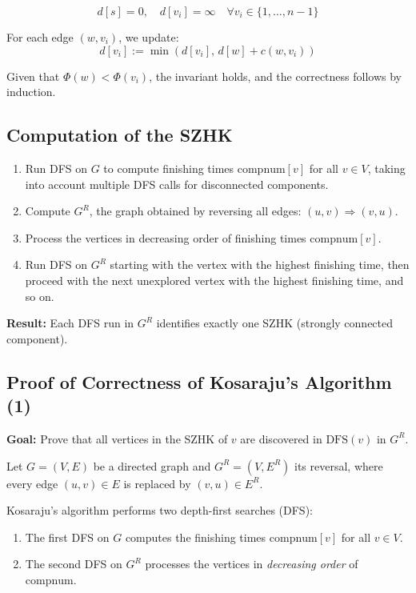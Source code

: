 \documentclass{article}
\begin{document}
\[
d[s] = 0, \quad d[v_i] = \infty \quad \forall v_i \in \{1, \ldots, n-1\}
\]

For each edge $(w, v_i)$, we update:
\[
d[v_i] := \min(d[v_i], \, d[w] + c(w, v_i))
\]

Given that $\Phi(w) < \Phi(v_i)$, the invariant holds, and the correctness follows by induction.

\subsection{Computation of the SZHK}

\begin{enumerate}
    \item Run DFS on $G$ to compute finishing times $\text{compnum}[v]$ for all $v \in V$, taking into account multiple DFS calls for disconnected components.
    \item Compute $G^R$, the graph obtained by reversing all edges: $(u,v) \Rightarrow (v,u)$.
    \item Process the vertices in decreasing order of finishing times $\text{compnum}[v]$.
    \item Run DFS on $G^R$ starting with the vertex with the highest finishing time, then proceed with the next unexplored vertex with the highest finishing time, and so on.
\end{enumerate}

\noindent
\textbf{Result:} Each DFS run in $G^R$ identifies exactly one SZHK (strongly connected component).

\subsection{Proof of Correctness of Kosaraju's Algorithm (1)}
\textbf{Goal:} Prove that all vertices in the SZHK of $v$ are discovered in $\text{DFS}(v)$ in $G^R$.

Let $G = (V, E)$ be a directed graph and $G^R = (V, E^R)$ its reversal, where every edge $(u, v) \in E$ is replaced by $(v, u) \in E^R$.

Kosaraju's algorithm performs two depth-first searches (DFS):
\begin{enumerate}
    \item The first DFS on $G$ computes the finishing times $\text{compnum}[v]$ for all $v \in V$.
    \item The second DFS on $G^R$ processes the vertices in \emph{decreasing order} of $\text{compnum}$.
\end{enumerate}
\end{document}
